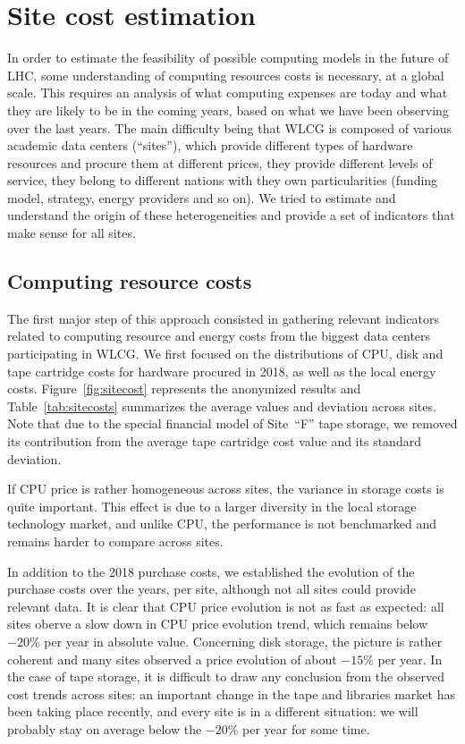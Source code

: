 \section{Site cost estimation}

In order to estimate the feasibility of possible computing models in
the future of LHC, some understanding of computing resources costs is
necessary, at a global scale.  This requires an analysis of what
computing expenses are today and what they are likely to be in the
coming years, based on what we have been observing over the last
years.  The main difficulty being that WLCG is composed of various academic
data centers (``sites''), which provide different types of hardware resources and procure
them at different prices, they provide different levels of service, they belong
to different nations with they own particularities (funding model, strategy, energy providers and so on).
We tried to estimate and understand the origin of these heterogeneities and provide a set of indicators
that make sense for all sites.

\subsection{\label{sec:sitecost:computing}Computing resource costs}
The first major step of this approach consisted in gathering relevant
indicators related to computing resource and energy costs from the
biggest data centers participating in WLCG.  We first focused on the
distributions of CPU, disk and tape cartridge costs for hardware
procured in 2018, as well as the local energy costs.
Figure~\ref{fig:sitecost} represents the anonymized results and
Table~\ref{tab:sitecosts} summarizes the average values and deviation
across sites. Note that due to the special financial model of Site~``F''
tape storage, we removed its contribution from the average tape
cartridge cost value and its standard deviation.

If CPU price is rather homogeneous across sites, the variance in
storage costs is quite important. This effect is due to a larger
diversity in the local storage technology market, and unlike CPU, the
performance is not benchmarked and remains harder to compare across
sites.

In addition to the 2018 purchase costs, we established the evolution
of the purchase costs over the years, per site, although not all sites
could provide relevant data. It is clear that CPU price evolution is
not as fast as expected: all sites oberve a slow down in CPU price
evolution trend, which remains below $-20 \%$ per year in absolute
value.  Concerning disk storage, the picture is rather coherent and
many sites observed a price evolution of about $-15 \%$ per year.  In
the case of tape storage, it is difficult to draw any conclusion from
the observed cost trends across sites: an important change in the tape
and libraries market has been taking place recently, and every site is
in a different situation: we will probably stay on average below the
$-20 \%$ per year for some time.

